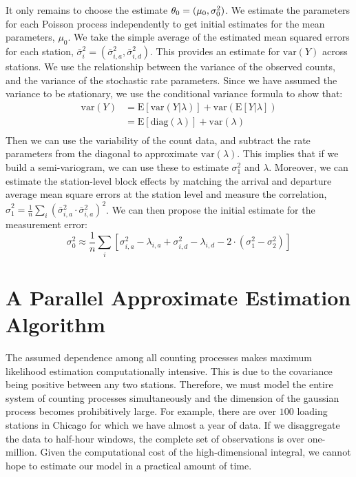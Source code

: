 \documentclass{acm_proc_article-sp}
\begin{document}
It only remains to choose the estimate $\theta_0 = (\mu_0 , {\bf \sigma}_0^2)$.  We estimate the parameters for each Poisson process independently to get initial estimates for the mean parameters, $\mu_0$.  We take the simple average of the estimated mean squared errors for each station, $\bar{\sigma}_i^2 = \left( \bar{\sigma}_{i,a}^2 ,\bar{\sigma}_{i,d}^2 \right)$.  This provides an estimate for $\text{var} (Y)$ across stations.   We use the relationship between the variance of the observed counts, and the variance of the stochastic rate parameters.  Since we have assumed the variance to be stationary, we use the conditional variance formula to show that:
\begin{align*} 
\text{var} \left( Y \right) &= \text{E} \left[ \text{var} \left( Y | \lambda \right) \right] + \text{var} \left( \text{E} \left[ Y | \lambda \right] \right) \\
&= \text{E} \left[ \text{diag} (\lambda) \right] + \text{var} \left( \lambda \right) \\
\end{align*}
\noindent Then we can use the variability of the count data, and subtract the rate parameters from the diagonal to approximate $\text{var}(\lambda)$.  This implies that if we build a semi-variogram, we can use these to estimate $\sigma_1^2$ and $\lambda$.  Moreover, we can estimate the station-level block effects by matching the arrival and departure average mean square errors at the station level and measure the correlation, $\hat{\sigma}_1^2 = \frac{1}{n} \sum_i ( \bar{\sigma}_{i,a}^2  \cdot \bar{\sigma}_{i,a}^2 )^2$.  We can then propose the initial estimate for the measurement error:
\begin{equation*}
\sigma_0^2 \approx \frac{1}{n}\sum_i \left[ \sigma^2_{i,a} - \lambda_{i,a} + \sigma^2_{i,d} - \lambda_{i,d}  - 2\cdot \left(\sigma_1^2 - \sigma_2^2 \right) \right]
\end{equation*}

\section{A Parallel Approximate Estimation Algorithm} \label{parallel_estimation}

The assumed dependence among all counting processes makes maximum likelihood estimation computationally intensive.  This is due to the covariance being positive between any two stations.  Therefore, we must model the entire system of counting processes simultaneously and the dimension of the gaussian process becomes prohibitively large.  For example, there are over $100$ loading stations in Chicago for which we have almost a year of data.  If we disaggregate the data to half-hour windows, the complete set of observations is over one-million.  Given the computational cost of the high-dimensional integral, we cannot hope to estimate our model in a practical amount of time.
\end{document}
